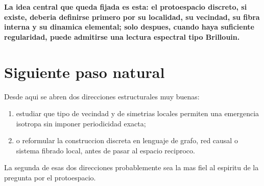 \begin{displayquote}
\textbf{La idea central que queda fijada es esta: el protoespacio discreto, si existe, deberia definirse primero por su localidad, su vecindad, su fibra interna y su dinamica elemental; solo despues, cuando haya suficiente regularidad, puede admitirse una lectura espectral tipo Brillouin.}
\end{displayquote}

\section{Siguiente paso natural}
Desde aqui se abren dos direcciones estructurales muy buenas:
\begin{enumerate}[label=\arabic*.]
    \item estudiar que tipo de vecindad y de simetrias locales permiten una emergencia isotropa sin imponer periodicidad exacta;
    \item o reformular la construccion discreta en lenguaje de grafo, red causal o sistema fibrado local, antes de pasar al espacio reciproco.
\end{enumerate}

La segunda de esas dos direcciones probablemente sea la mas fiel al espiritu de la pregunta por el protoespacio.
